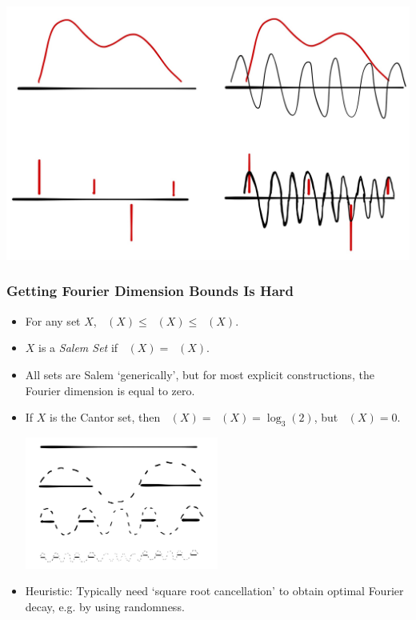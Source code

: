 \documentclass[usenames,dvipsnames]{beamer}
\DeclareMathOperator{\fordim}{\text{dim}_{\textbf{F}}}
\DeclareMathOperator{\hausdim}{\text{dim}_{\textbf{H}}}
\DeclareMathOperator{\minkdim}{\text{dim}_{\textbf{M}}}
\begin{document}
\begin{frame}
    \includegraphics[width=\textwidth]{../Images/FourierDimension}
\end{frame}



\begin{frame}
    \frametitle{Getting Fourier Dimension Bounds Is Hard}

    \begin{itemize}
        \item For any set $X$, $\fordim(X) \leq \hausdim(X) \leq \minkdim(X)$.

        \pause
        \item $X$ is a \emph{Salem Set} if $\fordim(X) = \hausdim(X)$.

        \pause
        \item All sets are Salem `generically', but for most explicit constructions, the Fourier dimension is equal to zero.

        \pause
        \item If $X$ is the Cantor set, then $\hausdim(X) = \minkdim(X) = \log_3(2)$, but $\fordim(X) = 0$.

        \begin{center}
        \includegraphics[width=0.5\textwidth]{../Images/CantorSetFourier}
        \end{center}

        \pause
        \item Heuristic: Typically need `square root cancellation' to obtain optimal Fourier decay, e.g. by using randomness.
    \end{itemize}
\end{frame}
\end{document}
